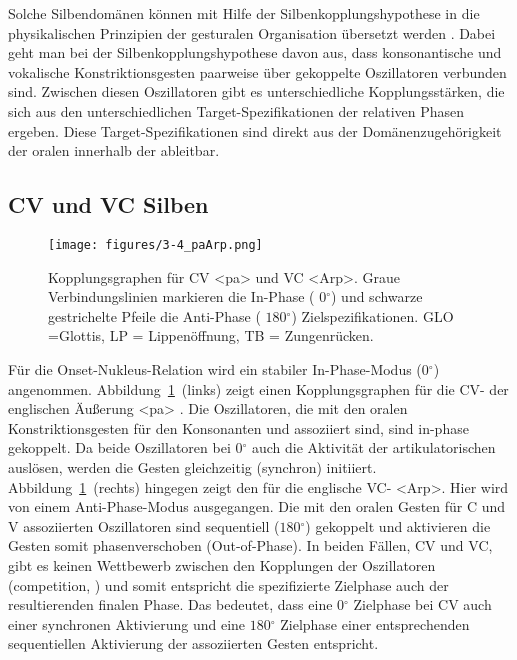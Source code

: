 Solche Silbendomänen können mit Hilfe der Silbenkopplungshypothese in die physikalischen Prinzipien der gesturalen Organisation übersetzt werden \citep{Goldstein2007a, Nam2009b}. Dabei geht man bei der Silbenkopplungshypothese davon aus, dass konsonantische und vokalische Konstriktionsgesten paarweise über gekoppelte Oszillatoren verbunden sind. Zwischen diesen Oszillatoren gibt es unterschiedliche Kopplungsstärken, die sich aus den unterschiedlichen Target-Spezifikationen der relativen Phasen ergeben. Diese Target-Spezifikationen sind direkt aus der Domänenzugehörigkeit der oralen  innerhalb der  ableitbar.


\subsection{CV und VC Silben}
\label{subsec:030301}

\begin{figure}[t]
	\texttt{[image: figures/3-4\_paArp.png]}
	\caption{Kopplungsgraphen für CV <pa> und VC <Arp>. Graue Verbindungslinien markieren die In-Phase ( $0{}^{\circ}$) und schwarze gestrichelte Pfeile die Anti-Phase ( $180{}^{\circ}$) Zielspezifikationen. GLO =Glottis, LP = Lippenöffnung, TB = Zungenrücken.}
	\label{figure:0304}
\end{figure}
Für die Onset-Nukleus-Relation wird ein stabiler In-Phase-Modus ($0{}^{\circ}$) angenommen. Abbildung~\ref{figure:0304}~(links) zeigt einen Kopplungsgraphen für die CV- der englischen Äußerung <pa> \citep[vgl.][]{Mücke2012}.  Die Oszillatoren, die mit den oralen Konstriktionsgesten für den Konsonanten und  assoziiert sind, sind in-phase gekoppelt. Da beide Oszillatoren bei $0{}^{\circ}$ auch die Aktivität der artikulatorischen  auslösen, werden die Gesten gleichzeitig (synchron) initiiert. Abbildung~\ref{figure:0304}~(rechts) hingegen zeigt den  für die englische VC- <Arp>. Hier wird von einem Anti-Phase-Modus ausgegangen. Die mit den oralen Gesten für C und V assoziierten Oszillatoren sind sequentiell ($180{}^{\circ}$) gekoppelt und aktivieren die Gesten somit phasenverschoben (Out-of-Phase). In beiden Fällen, CV und VC, gibt es keinen Wettbewerb zwischen den Kopplungen der Oszillatoren (competition, \citealt{Goldstein2007a}) und somit entspricht die spezifizierte Zielphase auch der resultierenden finalen Phase. Das bedeutet, dass eine $0{}^{\circ}$ Zielphase bei CV auch einer synchronen Aktivierung und eine $180{}^{\circ}$ Zielphase einer entsprechenden sequentiellen Aktivierung der assoziierten Gesten entspricht.




